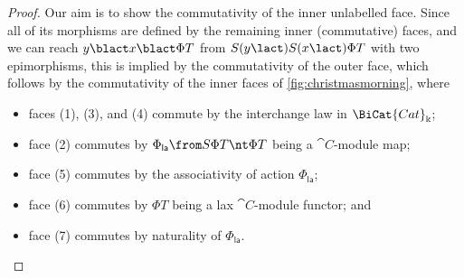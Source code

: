 \begin{proof}
  Our aim is to show the commutativity of the inner unlabelled face.
  Since all of its morphisms are defined by the remaining inner (commutative) faces,
  and we can reach \(y \blact x \blact \Phi T\) from \(S(y \lact)S(x \lact)\Phi T\) with two epimorphisms,
  this is implied by the commutativity of the outer face,
  which follows by the commutativity of the inner faces of \cref{fig:christmasmorning},
  where
  \begin{itemize}[noitemsep]
    \item faces (1), (3), and (4) commute by the interchange law in \(\BiCat{Cat}_{\Bbbk}\);
    \item face (2) commutes by \(\Phi_{\mathsf{la}}\from S \Phi T \nt \Phi T\) being a \(\cat{C}\)\hyp{}module map;
    \item face (5) commutes by the associativity of action \(\Phi_{\mathsf{la}}\);
    \item face (6) commutes by \(\Phi T\) being a lax \(\cat{C}\)\hyp{}module functor; and
    \item face (7) commutes by naturality of \(\Phi_{\mathsf{la}}\).\qedhere
  \end{itemize}
  \begin{figure}[htbp]
    \centering
\end{figure}
\end{proof}
